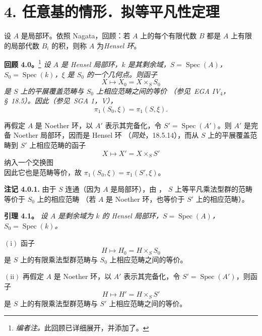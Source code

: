 \section*{4. 任意基的情形．拟等平凡性定理}
{}

设 \(A\) 是局部环。依照 Nagata，回顾：若 \(A\) 上的每个有限代数 \(B\)
都是 \(A\) 上有限的局部代数 \(B_i\) 的积，则称 \(A\) 为\emph{Hensel 环}。

\par\medskip\noindent
\textbf{回顾 4.0。}\footnote{\textit{编者注。}此回顾已详细展开，并添加了。}\enspace
\emph{设 \(A\) 是 Hensel 局部环，\(k\) 是其剩余域，\(S=\operatorname{Spec}(A)\)，
\(S_0=\operatorname{Spec}(k)\)，\(\xi\) 是 \(S_0\) 的一个几何点。则函子}
\[
  X\longmapsto X_0=X\times_S S_0
\]
\emph{是 \(S\) 上的平展覆盖范畴与 \(S_0\) 上相应范畴之间的等价
（参见\ EGA IV\(_4\)，\S~18.5）。因此（参见\ SGA 1，V），}
\[
  \pi_1(S_0,\xi)=\pi_1(S,\xi).
\]

再假定 \(A\) 是 Noether 环，以 \(A'\) 表示其完备化，令
\(S'=\operatorname{Spec}(A')\)。则 \(A'\) 是完备 Noether 局部环，因而是 Hensel 环
（\emph{同处}，18.5.14），而从 \(S\) 上的平展覆盖范畴到 \(S'\) 上相应范畴的函子
\[
  X\longmapsto X'=X\times_S S'
\]
纳入一个交换图
\[
  
\]
因此它也是范畴等价，故 \(\pi_1(S_0,\xi)=\pi_1(S',\xi)\)。

\par\medskip\noindent
\textbf{注记 4.0.1.}\enspace
由于 \(S\) 连通（因为 \(A\) 是局部环），由 ，
\(S\) 上等平凡乘法型群的范畴等价于 \(S_0\) 上的相应范畴
（若 \(A\) 是 Noether 环，也等价于 \(S'\) 上的相应范畴）。

\par\medskip\noindent
\textbf{引理 4.1。}\enspace
\begingroup\itshape
设 \(A\) 是剩余域为 \(k\) 的 Hensel 局部环，\(S=\operatorname{Spec}(A)\)，
\(S_0=\operatorname{Spec}(k)\)。

\smallskip
\noindent
\(\mathrm{(i)}\) 函子
\[
  H\longmapsto H_0=H\times_S S_0
\]
是 \(S\) 上的有限乘法型群范畴与 \(S_0\) 上相应范畴之间的等价。

\smallskip
\noindent
\(\mathrm{(ii)}\) 再假定 \(A\) 是 Noether 环，以 \(A'\) 表示其完备化，令 \(S'=\operatorname{Spec}(A')\)，则函子
\[
  H\longmapsto H'=H\times_S S'
\]
是 \(S\) 上的有限乘法型群范畴与 \(S'\) 上相应范畴之间的等价。
\par\endgroup

